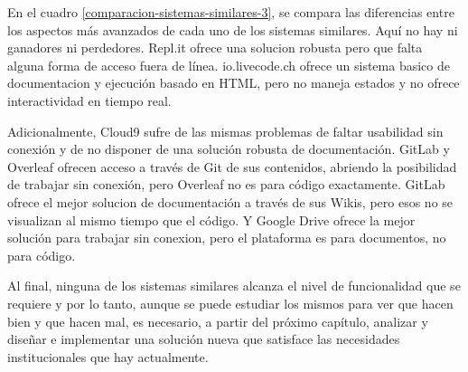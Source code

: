 En el cuadro \ref{comparacion-sistemas-similares-3}, se compara las diferencias entre los aspectos más avanzados de cada uno de los sistemas similares. Aquí no hay ni ganadores ni perdedores. Repl.it ofrece una solucion robusta pero que falta alguna forma de acceso fuera de línea. io.livecode.ch ofrece un sistema basico de documentacion y ejecución basado en HTML, pero no maneja estados y no ofrece interactividad en tiempo real.

Adicionalmente, Cloud9 sufre de las mismas problemas de faltar usabilidad sin conexión y de no disponer de una solución robusta de documentación. GitLab y Overleaf ofrecen acceso a través de Git de sus contenidos, abriendo la posibilidad de trabajar sin conexión, pero Overleaf no es para código exactamente. GitLab ofrece el mejor solucion de documentación a través de sus Wikis, pero esos no se visualizan al mismo tiempo que el código. Y Google Drive ofrece la mejor solución para trabajar sin conexion, pero el plataforma es para documentos, no para código.

Al final, ninguna de los sistemas similares alcanza el nivel de funcionalidad que se requiere y por lo tanto, aunque se puede estudiar los mismos para ver que hacen bien y que hacen mal, es necesario, a partir del próximo capítulo, analizar y diseñar e implementar una solución nueva que satisface las necesidades institucionales que hay actualmente.
